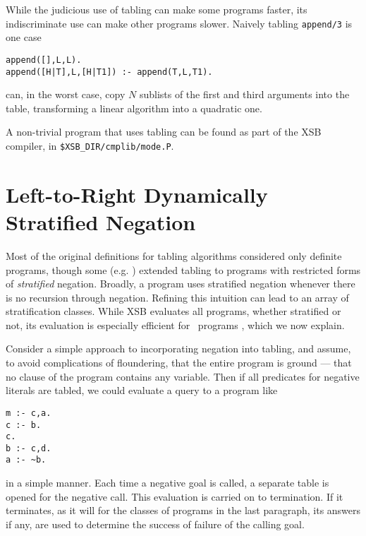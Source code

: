 While the judicious use of tabling can make some programs faster, its 
indiscriminate use can make other programs slower.  Naively tabling 
{\tt append/3} is one case
\begin{center}
\begin{minipage}{3.5in}
\begin{verbatim}
append([],L,L).
append([H|T],L,[H|T1]) :- append(T,L,T1).
\end{verbatim}						       
\end{minipage}
\end{center}
can, in the worst case, copy $N$ sublists of the first and third
arguments into the table, transforming a linear algorithm into a
quadratic one.

A non-trivial program that uses tabling can be found as part of the
XSB compiler, in {\tt \$XSB\_DIR/cmplib/mode.P}.

\section{Left-to-Right Dynamically Stratified Negation}

Most of the original definitions for tabling algorithms considered
only definite programs, though some (e.g. \cite{KeTo88,Seki89})
extended tabling to programs with restricted forms of {\em stratified}
negation.  Broadly, a program uses stratified negation whenever there
is no recursion through negation.  Refining this intuition can lead to
an array of stratification classes.  While XSB evaluates all programs,
whether stratified or not, its evaluation is especially efficient for
\LRD\ programs \cite{SaSW95a}, which we now explain.

Consider a simple approach to incorporating negation into tabling, and
assume, to avoid complications of floundering, that the entire program
is ground --- that no clause of the program contains any variable.
Then if all predicates for negative literals are tabled, we could
evaluate a query to a program like
\begin{center}
\begin{minipage}{1.5in}
\begin{verbatim}
m :- c,a.
c :- b.
c.
b :- c,d.
a :- ~b.
\end{verbatim}
\end{minipage}
\end{center}
in a simple manner. Each time a negative goal is called, a separate
table is opened for the negative call.  This evaluation is carried on
to termination.  If it terminates, as it will for the classes of
programs in the last paragraph, its answers if any, are used to
determine the success of failure of the calling goal. 

